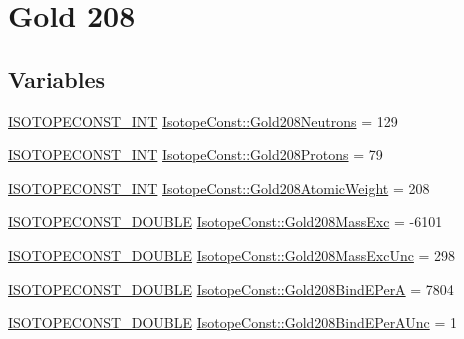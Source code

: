 \hypertarget{group___isotope_const-_gold-_au208}{}\section{Gold 208}
\label{group___isotope_const-_gold-_au208}
\subsection*{Variables}
\begin{DoxyCompactItemize}
\item 
\mbox{\hyperlink{group___isotope_const-_macros_ga5f18360b3e99483a35c32d789e62621c}{I\+S\+O\+T\+O\+P\+E\+C\+O\+N\+S\+T\+\_\+\+I\+NT}} \mbox{\hyperlink{group___isotope_const-_gold-_au208_ga078e968af00e59fe4e3133a36c6d422d}{Isotope\+Const\+::\+Gold208\+Neutrons}} = 129
\item 
\mbox{\hyperlink{group___isotope_const-_macros_ga5f18360b3e99483a35c32d789e62621c}{I\+S\+O\+T\+O\+P\+E\+C\+O\+N\+S\+T\+\_\+\+I\+NT}} \mbox{\hyperlink{group___isotope_const-_gold-_au208_ga4ad7c8f54a56e5ddab6167d433cb6fe3}{Isotope\+Const\+::\+Gold208\+Protons}} = 79
\item 
\mbox{\hyperlink{group___isotope_const-_macros_ga5f18360b3e99483a35c32d789e62621c}{I\+S\+O\+T\+O\+P\+E\+C\+O\+N\+S\+T\+\_\+\+I\+NT}} \mbox{\hyperlink{group___isotope_const-_gold-_au208_gacdef666e0c3a27d7e9d90907f895db19}{Isotope\+Const\+::\+Gold208\+Atomic\+Weight}} = 208
\item 
\mbox{\hyperlink{group___isotope_const-_macros_ga8f45a7272ce02c0b4c65c44636ed719a}{I\+S\+O\+T\+O\+P\+E\+C\+O\+N\+S\+T\+\_\+\+D\+O\+U\+B\+LE}} \mbox{\hyperlink{group___isotope_const-_gold-_au208_gae021e357bedd2d02ab93cdc083591848}{Isotope\+Const\+::\+Gold208\+Mass\+Exc}} = -\/6101
\item 
\mbox{\hyperlink{group___isotope_const-_macros_ga8f45a7272ce02c0b4c65c44636ed719a}{I\+S\+O\+T\+O\+P\+E\+C\+O\+N\+S\+T\+\_\+\+D\+O\+U\+B\+LE}} \mbox{\hyperlink{group___isotope_const-_gold-_au208_gaf237e63670e783589caa4f441fe01bcb}{Isotope\+Const\+::\+Gold208\+Mass\+Exc\+Unc}} = 298
\item 
\mbox{\hyperlink{group___isotope_const-_macros_ga8f45a7272ce02c0b4c65c44636ed719a}{I\+S\+O\+T\+O\+P\+E\+C\+O\+N\+S\+T\+\_\+\+D\+O\+U\+B\+LE}} \mbox{\hyperlink{group___isotope_const-_gold-_au208_gacdf9fc2e129c43abfea480f6d96dcf16}{Isotope\+Const\+::\+Gold208\+Bind\+E\+PerA}} = 7804
\item 
\mbox{\hyperlink{group___isotope_const-_macros_ga8f45a7272ce02c0b4c65c44636ed719a}{I\+S\+O\+T\+O\+P\+E\+C\+O\+N\+S\+T\+\_\+\+D\+O\+U\+B\+LE}} \mbox{\hyperlink{group___isotope_const-_gold-_au208_gac6a9426483b9779a3491129c9b1e74b2}{Isotope\+Const\+::\+Gold208\+Bind\+E\+Per\+A\+Unc}} = 1

\end{DoxyCompactItemize}
